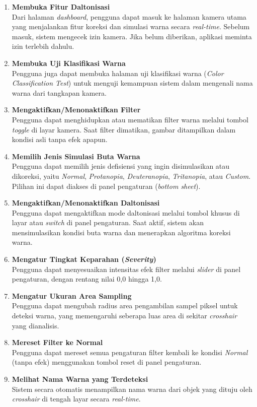 \begin{enumerate}
  \item \textbf{Membuka Fitur Daltonisasi} \\
  Dari halaman \textit{dashboard}, pengguna dapat masuk ke halaman kamera utama yang menjalankan fitur koreksi dan simulasi warna secara \textit{real-time}.
  Sebelum masuk, sistem mengecek izin kamera. Jika belum diberikan, aplikasi meminta izin terlebih dahulu.

  \item \textbf{Membuka Uji Klasifikasi Warna} \\
  Pengguna juga dapat membuka halaman uji klasifikasi warna (\textit{Color Classification Test}) untuk menguji kemampuan sistem dalam mengenali nama warna dari tangkapan kamera.

  \item \textbf{Mengaktifkan/Menonaktifkan Filter} \\
  Pengguna dapat menghidupkan atau mematikan filter warna melalui tombol \textit{toggle} di layar kamera.
  Saat filter dimatikan, gambar ditampilkan dalam kondisi asli tanpa efek apapun.

  \item \textbf{Memilih Jenis Simulasi Buta Warna} \\
  Pengguna dapat memilih jenis defisiensi yang ingin disimulasikan atau dikoreksi, yaitu \textit{Normal}, \textit{Protanopia}, \textit{Deuteranopia}, \textit{Tritanopia}, atau \textit{Custom}.
  Pilihan ini dapat diakses di panel pengaturan (\textit{bottom sheet}).

  \item \textbf{Mengaktifkan/Menonaktifkan Daltonisasi} \\
  Pengguna dapat mengaktifkan mode daltonisasi melalui tombol khusus di layar atau \textit{switch} di panel pengaturan.
  Saat aktif, sistem akan mensimulasikan kondisi buta warna dan menerapkan algoritma koreksi warna.

  \item \textbf{Mengatur Tingkat Keparahan (\textit{Severity})} \\
  Pengguna dapat menyesuaikan intensitas efek filter melalui \textit{slider} di panel pengaturan, dengan rentang nilai 0,0 hingga 1,0.

  \item \textbf{Mengatur Ukuran Area Sampling} \\
  Pengguna dapat mengubah radius area pengambilan sampel piksel untuk deteksi warna, yang memengaruhi seberapa luas area di sekitar \textit{crosshair} yang dianalisis.

  \item \textbf{Mereset Filter ke Normal} \\
  Pengguna dapat mereset semua pengaturan filter kembali ke kondisi \textit{Normal} (tanpa efek) menggunakan tombol reset di panel pengaturan.

  \item \textbf{Melihat Nama Warna yang Terdeteksi} \\
  Sistem secara otomatis menampilkan nama warna dari objek yang dituju oleh \textit{crosshair} di tengah layar secara \textit{real-time}.
\end{enumerate}

